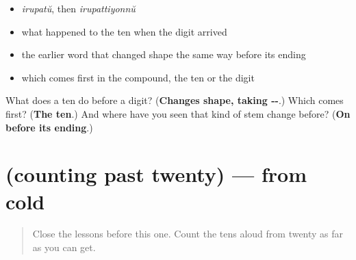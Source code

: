 \begin{itemize}
\raggedright
  \item \emph{irupatŭ}, then \emph{irupattiyonnŭ}
  \item what happened to the ten when the digit arrived
  \item the earlier word that changed shape the same way before its ending
  \item which comes first in the compound, the ten or the digit
\end{itemize}

\begin{tcolorbox}[breakable,colback=teal!4,colframe=teal!35!black,title={Before you move on}]
What does a ten do before a digit? (\textbf{Changes shape, taking --}.) Which comes first? (\textbf{The ten}.) And where have you seen that kind of stem change before? (\textbf{On  before its ending}.)
\end{tcolorbox}
\section[(counting past twenty)]{(counting past twenty) — from cold}

\label{lesson:ML-R88-numbers-recall}



\begin{quote}
Close the lessons before this one. Count the tens aloud from twenty as far as you can get.
\end{quote}


